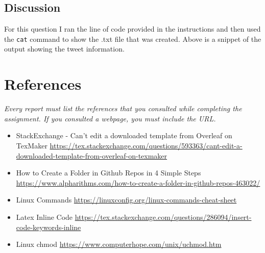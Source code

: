 \documentclass[12pt]{article}
\begin{document}
\subsection*{Discussion}

For this question I ran the line of code provided in the instructions and then used the \lstinline{cat} command to show the .txt file that was created. Above is a snippet of the output showing the tweet information.

\section*{References}

\emph{Every report must list the references that you consulted while completing the assignment. If you consulted a webpage, you must include the URL.}

\begin{itemize}
    \item {StackExchange - Can't edit a downloaded template from Overleaf on TexMaker} \url{https://tex.stackexchange.com/questions/593363/cant-edit-a-downloaded-template-from-overleaf-on-texmaker}
    \item {How to Create a Folder in Github Repos in 4 Simple Steps}
    \url{https://www.alpharithms.com/how-to-create-a-folder-in-github-repos-463022/}
    \item {Linux Commands} \url{https://linuxconfig.org/linux-commands-cheat-sheet}
    \item {Latex Inline Code} \url{https://tex.stackexchange.com/questions/286094/insert-code-keywords-inline}
    \item{Linux chmod} \url{https://www.computerhope.com/unix/uchmod.htm}
\end{itemize}
\end{document}
